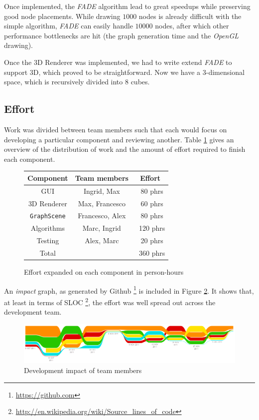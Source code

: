 \documentclass[a4paper,11pt,titlepage]{article}
\newcommand{\code}[1]{\texttt{#1}}
\newcommand{\buzz}[1]{\emph{#1}}
\newcommand{\OpenGL}{\buzz{OpenGL} }
\newcommand{\FADE}{\buzz{FADE} }
\begin{document}
Once implemented, the \FADE algorithm lead to great speedups while
preserving good node placements. While drawing $1000$ nodes is already
difficult with the simple algorithm, \FADE can easily handle $10000$
nodes, after which other performance bottlenecks are hit (the graph
generation time and the \OpenGL drawing).

Once the 3D Renderer was implemented, we had to write extend \FADE to
support 3D, which proved to be straightforward. Now we have a
$3$-dimensional space, which is recursively divided into $8$ cubes.

\subsection{Effort}

Work was divided between team members such that each would focus on
developing a particular component and reviewing another. Table
\ref{fig:effort} gives an overview of the distribution of work and the
amount of effort required to finish each component.

\begin{figure}[h]
  \centering
  \begin{tabular}{c|c|c}
    Component         & Team members    & Effort \\
    \hline
    GUI               & Ingrid, Max     & ~80 phrs \\
    3D Renderer       & Max, Francesco  & ~60 phrs\\
    \code{GraphScene} & Francesco, Alex & ~80 phrs\\
    Algorithms        & Marc, Ingrid    & ~120 phrs\\
    Testing           & Alex, Marc      & ~20 phrs\\
    \hline
    Total             &                 & ~360 phrs
  \end{tabular}
  \caption{Effort expanded on each component in person-hours}
  \label{fig:effort}
\end{figure}

An \emph{impact} graph, as generated by
Github \footnote{\url{https://github.com}} is included in Figure
\ref{fig:impact}. It shows that, at least in terms of
SLOC \footnote{\url{http://en.wikipedia.org/wiki/Source_lines_of_code}},
the effort was well spread out across the development team.

\begin{figure}[h]
  \centering
  \includegraphics[width=\textwidth]{impact.png}
  \caption{Development impact of team members}
  \label{fig:impact}
\end{figure}
\end{document}
